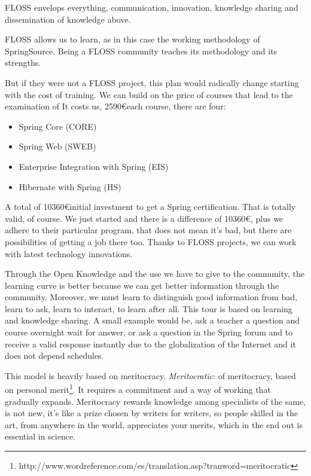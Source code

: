 \documentclass[11pt]{scrartcl}
\begin{document}
\par FLOSS envelops everything, communication, innovation, knowledge sharing and dissemination of knowledge above.

\par FLOSS allows us to learn, as in this case the working methodology of SpringSource. Being a FLOSS community teaches its methodology and its strengths.

\par But if they were not a FLOSS project, this plan would radically change starting with the cost of training. We can build on the price of courses that lead to the examination of It costs us, 2590\euro each course, there are four:

\begin{itemize}
    \item Spring Core (CORE)
    \item Spring Web (SWEB)
    \item Enterprise Integration with Spring (EIS)
    \item Hibernate with Spring (HS)
\end{itemize}

\par A total of 10360\euro initial investment to get a Spring certification. That is totally valid, of course. We just started and there is a difference of 10360\euro, plus we adhere to their particular program, that does not mean it's bad, but there are possibilities of getting a job there too. Thanks to FLOSS projects, we can work with latest technology innovations.

\par Through the Open Knowledge and the use we have to give to the community, the learning curve is better because we can get better information through the community. Moreover, we must learn to distinguish good information from bad, learn to ask, learn to interact, to learn after all. This tour is based on learning and knowledge sharing. A small example would be, ask a teacher a question and course overnight wait for answer, or ask a question in the Spring forum and to receive a valid response instantly due to the globalization of the Internet and it does not depend schedules.

\par This model is heavily based on meritocracy. \emph{Meritocratic}: of meritocracy, based on personal merit\footnote {http://www.wordreference.com/es/translation.asp?tranword=meritocratic}. It requires a commitment and a way of working that gradually expands. Meritocracy rewards knowledge among specialists of the same, is not new, it's like a prize chosen by writers for writers, so people skilled in the art, from anywhere in the world, appreciates your merits, which in the end out is essential in science.
\end{document}
